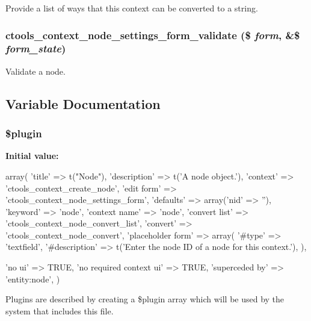 \label{ctools_2plugins_2contexts_2node_8inc_a0fcbefea62745d0bcc96ee8ab7b25086}
Provide a list of ways that this context can be converted to a string. \hypertarget{ctools_2plugins_2contexts_2node_8inc_a451887cc1c3b00f3af081fd54e51adea}{
\subsubsection[{ctools\_\-context\_\-node\_\-settings\_\-form\_\-validate}]{\setlength{\rightskip}{0pt plus 5cm}ctools\_\-context\_\-node\_\-settings\_\-form\_\-validate (\$ {\em form}, \/  \&\$ {\em form\_\-state})}}
\label{ctools_2plugins_2contexts_2node_8inc_a451887cc1c3b00f3af081fd54e51adea}
Validate a node. 

\subsection{Variable Documentation}
\hypertarget{ctools_2plugins_2contexts_2node_8inc_ada8a7130088351710bb02ed622d6bf65}{
\subsubsection[{\$plugin}]{\setlength{\rightskip}{0pt plus 5cm}\$plugin}}
\label{ctools_2plugins_2contexts_2node_8inc_ada8a7130088351710bb02ed622d6bf65}
{\bfseries Initial value:}
\begin{DoxyCode}
 array(
  'title' => t("Node"),
  'description' => t('A node object.'),
  'context' => 'ctools_context_create_node',
  'edit form' => 'ctools_context_node_settings_form',
  'defaults' => array('nid' => ''),
  'keyword' => 'node',
  'context name' => 'node',
  'convert list' => 'ctools_context_node_convert_list',
  'convert' => 'ctools_context_node_convert',
  'placeholder form' => array(
    '#type' => 'textfield',
    '#description' => t('Enter the node ID of a node for this context.'),
  ),
  
  'no ui' => TRUE,
  'no required context ui' => TRUE,
  'superceded by' => 'entity:node',
)
\end{DoxyCode}
Plugins are described by creating a \$plugin array which will be used by the system that includes this file. 